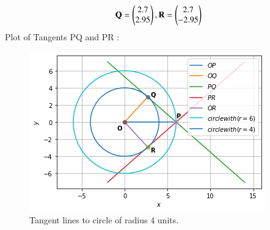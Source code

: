 \documentclass[journal,12pt,twocolumn]{IEEEtran}
\begin{document}
\begin{align}
\mathbf{Q}=\begin{pmatrix}2.7\\2.95\end{pmatrix},
\mathbf{R}=\begin{pmatrix}2.7\\-2.95\end{pmatrix}
\end{align}
Plot of Tangents PQ and PR :
\begin{figure}[ht]
    \centering
    \includegraphics[width=\columnwidth]{TANGENT.png}
    \caption{Tangent lines to circle of radius 4 units.}
    \label{fig:Tangent lines to circle of radius 4 units.}
\end{figure}    
\end{document}
